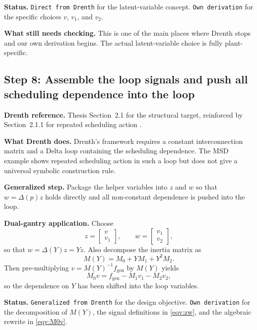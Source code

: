 ﻿\documentclass[11pt]{article}
\newcommand{\audititem}[2]{\par\smallskip\noindent\textbf{#1.} #2\par}
\newcommand{\statusline}[1]{\texttt{#1}}
\begin{document}
\audititem{Status}{\statusline{Direct from Drenth} for the latent-variable
concept. \statusline{Own derivation} for the specific choices
$v$, $v_1$, and $v_2$.}

\audititem{What still needs checking}{This is one of the main places where
Drenth stops and our own derivation begins. The actual latent-variable choice is
fully plant-specific.}

\subsection{Step 8: Assemble the loop signals and push all scheduling dependence into the loop}

\audititem{Drenth reference}{Thesis Section~2.1 for the structural target,
reinforced by Section~2.1.1 for repeated scheduling action
\cite{drenth2025thesis}.}

\audititem{What Drenth does}{Drenth's framework requires a constant
interconnection matrix and a Delta loop containing the scheduling dependence.
The MSD example shows repeated scheduling action in such a loop but does not
give a universal symbolic construction rule.}

\audititem{Generalized step}{Package the helper variables into $z$ and $w$ so
that $w=\Delta(p)z$ holds directly and all non-constant dependence is pushed
into the loop.}

\audititem{Dual-gantry application}{Choose
\begin{equation}
    z = \begin{bmatrix} v \\ v_1 \end{bmatrix}, \qquad
    w = \begin{bmatrix} v_1 \\ v_2 \end{bmatrix},
    \label{eqv:zw}
\end{equation}
so that $w = \Delta(Y) z = Y z$. Also decompose the inertia matrix as
\begin{equation}
    M(Y) = M_0 + Y M_1 + Y^2 M_2.
    \label{eqv:decomp}
\end{equation}
Then pre-multiplying $v = M(Y)^{-1} f_{\mathrm{gen}}$ by $M(Y)$ yields
\begin{equation}
    M_0 v = f_{\mathrm{gen}} - M_1 v_1 - M_2 v_2,
    \label{eqv:M0v}
\end{equation}
so the dependence on $Y$ has been shifted into the loop variables.}

\audititem{Status}{\statusline{Generalized from Drenth} for the design
objective. \statusline{Own derivation} for the decomposition of $M(Y)$, the
signal definitions in \eqref{eqv:zw}, and the algebraic rewrite in
\eqref{eqv:M0v}.}
\end{document}

